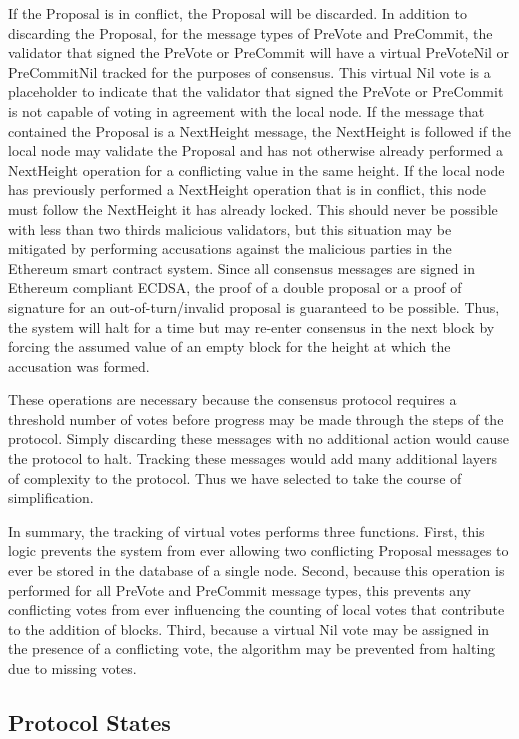 If the Proposal is in conflict, the Proposal will be discarded.
In addition to discarding the Proposal, for the message types of
PreVote and PreCommit, the validator that signed the PreVote or
PreCommit will have a virtual PreVoteNil or PreCommitNil tracked for
the purposes of consensus.
This virtual Nil vote is a placeholder to indicate that the validator
that signed the PreVote or PreCommit is not capable of voting in
agreement with the local node.
If the message that contained the Proposal is a NextHeight message, the
NextHeight is followed if the local node may validate the Proposal and
has not otherwise already performed a NextHeight operation for a
conflicting value in the same height.
If the local node has previously performed a NextHeight operation that
is in conflict, this node must follow the NextHeight it has already
locked.
This should never be possible with less than two thirds malicious
validators, but this situation may be mitigated by performing
accusations against the malicious parties in the Ethereum smart
contract system.
Since all consensus messages are signed in Ethereum compliant ECDSA,
the proof of a double proposal or a proof of signature for an
out-of-turn/invalid proposal is guaranteed to be possible.
Thus, the system will halt for a time but may re-enter consensus in the
next block by forcing the assumed value of an empty block for the
height at which the accusation was formed.

These operations are necessary because the consensus protocol requires
a threshold number of votes before progress may be made through the
steps of the protocol.
Simply discarding these messages with no additional action would cause
the protocol to halt.
Tracking these messages would add many additional layers of complexity
to the protocol.
Thus we have selected to take the course of simplification.

In summary, the tracking of virtual votes performs three functions.
First, this logic prevents the system from ever allowing two
conflicting Proposal messages to ever be stored in the database of a
single node.
Second, because this operation is performed for all PreVote and
PreCommit  message types, this prevents any conflicting votes from ever
influencing the counting of local votes that contribute to the addition
of blocks.
Third, because a virtual Nil vote may be assigned in the presence of a
conflicting vote, the algorithm may be prevented from halting due to
missing votes.


\subsection{Protocol States}

